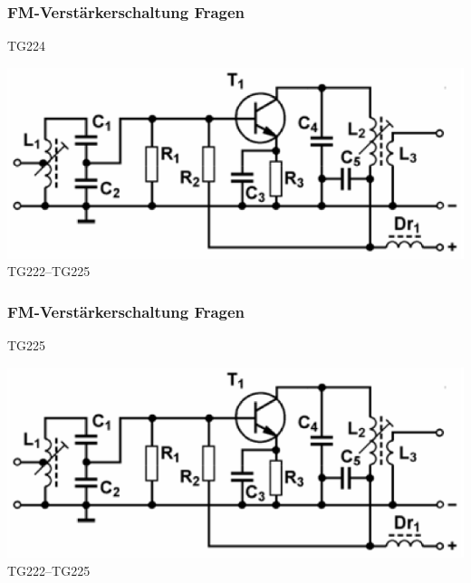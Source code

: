 \begin{frame}
  \frametitle{FM-Verstärkerschaltung Fragen}
  \begin{center}
    \begin{exampleblock}{TG224}
    \end{exampleblock}
    \includegraphics[width=1\textwidth,height=.5\textheight,keepaspectratio]{a07/TG222.png}\\
    {\tiny TG222--TG225 \hyperlink{refs}{\cite{bna}}}
  \end{center}
\end{frame}

\begin{frame}
  \frametitle{FM-Verstärkerschaltung Fragen}
  \begin{center}
    \begin{exampleblock}{TG225}
    \end{exampleblock}
    \includegraphics[width=1\textwidth,height=.5\textheight,keepaspectratio]{a07/TG222.png}\\
    {\tiny TG222--TG225 \hyperlink{refs}{\cite{bna}}}
  \end{center}
\end{frame}

